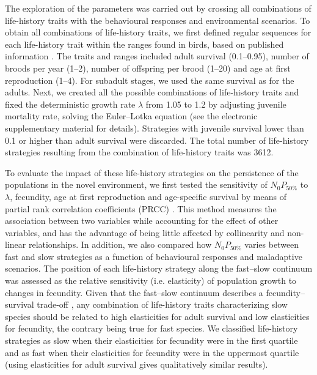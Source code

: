 The exploration of the parameters was carried out by crossing
all combinations of life-history traits with the behavioural
responses and environmental scenarios. To obtain all
combinations of life-history traits, we first defined regular
sequences for each life-history trait within the ranges found
in birds, based on published information \citep{Sol2012a, Sol2018}. The traits
and ranges included adult survival (0.1–0.95), number of
broods per year (1–2), number of offspring per brood (1–20)
and age at first reproduction (1–4). For subadult stages, we
used the same survival as for the adults. Next, we created all
the possible combinations of life-history traits and fixed the
deterministic growth rate $\lambda$ from 1.05 to 1.2 by adjusting juvenile
mortality rate, solving the Euler–Lotka equation (see the
electronic supplementary material for details). Strategies with
juvenile survival lower than 0.1 or higher than adult survival
were discarded. The total number of life-history strategies
resulting from the combination of life-history traits was 3612.

To evaluate the impact of these life-history strategies on
the persistence of the populations in the novel environment,
we first tested the sensitivity of $N_{0}P_{50\%}$ to $\lambda$, fecundity,
age at first reproduction and age-specific survival by means
of partial rank correlation coefficients (PRCC) \citep{saltelli2004sensitivity}. This
method measures the association between two variables
while accounting for the effect of other variables, and has
the advantage of being little affected by collinearity and
non-linear relationships. In addition, we also compared how
$N_{0}P_{50\%}$ varies between fast and slow strategies as a function
of behavioural responses and maladaptive scenarios. The
position of each life-history strategy along the fast–slow continuum
was assessed as the relative sensitivity (i.e. elasticity)
of population growth to changes in fecundity. Given that
the fast–slow continuum describes a fecundity–survival
trade-off \citep{stearns1992evolution}, any combination of life-history traits characterizing
slow species should be related to high elasticities for
adult survival and low elasticities for fecundity, the contrary
being true for fast species. We classified life-history strategies
as slow when their elasticities for fecundity were in the first
quartile and as fast when their elasticities for fecundity were
in the uppermost quartile (using elasticities for adult survival
gives qualitatively similar results).


